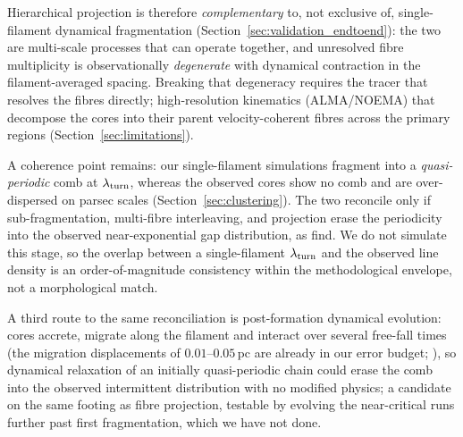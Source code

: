 \documentclass[usenatbib,twoside,twocolumn]{mnras}
\begin{document}
Hierarchical projection is therefore \emph{complementary} to, not exclusive of, single-filament dynamical fragmentation (Section~\ref{sec:validation_endtoend}): the two are multi-scale processes that can operate together, and unresolved fibre multiplicity is observationally \emph{degenerate} with dynamical contraction in the filament-averaged spacing. Breaking that degeneracy requires the tracer that resolves the fibres directly; high-resolution kinematics (ALMA/NOEMA) that decompose the cores into their parent velocity-coherent fibres across the primary regions (Section~\ref{sec:limitations}).

A coherence point remains: our single-filament simulations fragment into a \emph{quasi-periodic} comb at $\lambda_{\rm turn}$, whereas the observed cores show no comb and are over-dispersed on parsec scales (Section~\ref{sec:clustering}). The two reconcile only if sub-fragmentation, multi-fibre interleaving, and projection erase the periodicity into the observed near-exponential gap distribution, as \citet{Clarke2020} find. We do not simulate this stage, so the overlap between a single-filament $\lambda_{\rm turn}$ and the observed line density is an order-of-magnitude consistency within the methodological envelope, not a morphological match.

A third route to the same reconciliation is post-formation dynamical evolution: cores accrete, migrate along the filament and interact over several free-fall times (the migration displacements of $0.01$--$0.05$\,pc are already in our error budget; \citealt{Kirk2016,Mattern2018}), so dynamical relaxation of an initially quasi-periodic chain could erase the comb into the observed intermittent distribution with no modified physics; a candidate on the same footing as fibre projection, testable by evolving the near-critical runs further past first fragmentation, which we have not done.
\end{document}
